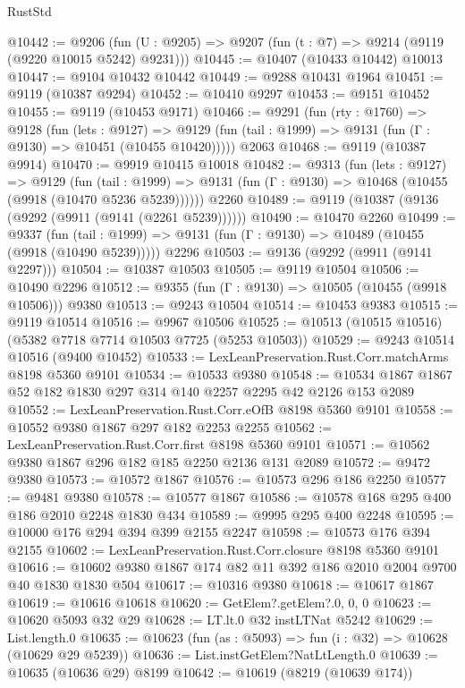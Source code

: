 \begin{lexlean}{RustStd}
\begin{coremodule}
@10442 := @9206
    (fun (U : @9205) => @9207 (fun (t : @7) => @9214 (@9119 (@9220 @10015 @5242) @9231)))
@10445 := @10407 (@10433 @10442) @10013
@10447 := @9104 @10432 @10442
@10449 := @9288 @10431 @1964
@10451 := @9119 (@10387 @9294)
@10452 := @10410 @9297
@10453 := @9151 @10452
@10455 := @9119 (@10453 @9171)
@10466 := @9291
    (fun (rty : @1760) =>
    @9128
      (fun (lets : @9127) =>
      @9129 (fun (tail : @1999) => @9131 (fun (Γ : @9130) => @10451 (@10455 @10420)))))
    @2063
@10468 := @9119 (@10387 @9914)
@10470 := @9919 @10415 @10018
@10482 := @9313
    (fun (lets : @9127) =>
    @9129
      (fun (tail : @1999) =>
      @9131 (fun (Γ : @9130) => @10468 (@10455 (@9918 (@10470 @5236 @5239))))))
    @2260
@10489 := @9119 (@10387 (@9136 (@9292 (@9911 (@9141 (@2261 @5239))))))
@10490 := @10470 @2260
@10499 := @9337
    (fun (tail : @1999) => @9131 (fun (Γ : @9130) => @10489 (@10455 (@9918 (@10490 @5239)))))
    @2296
@10503 := @9136 (@9292 (@9911 (@9141 @2297)))
@10504 := @10387 @10503
@10505 := @9119 @10504
@10506 := @10490 @2296
@10512 := @9355 (fun (Γ : @9130) => @10505 (@10455 (@9918 @10506))) @9380
@10513 := @9243 @10504
@10514 := @10453 @9383
@10515 := @9119 @10514
@10516 := @9967 @10506
@10525 := @10513 (@10515 @10516) (@5382 @7718 @7714 @10503 @7725 (@5253 @10503))
@10529 := @9243 @10514 @10516 (@9400 @10452)
@10533 := LexLeanPreservation.Rust.Corr.matchArms @8198 @5360 @9101
@10534 := @10533 @9380
@10548 := @10534 @1867 @1867 @52 @182 @1830 @297 @314 @140 @2257 @2295 @42 @2126 @153 @2089
@10552 := LexLeanPreservation.Rust.Corr.eOfB @8198 @5360 @9101
@10558 := @10552 @9380 @1867 @297 @182 @2253 @2255
@10562 := LexLeanPreservation.Rust.Corr.first @8198 @5360 @9101
@10571 := @10562 @9380 @1867 @296 @182 @185 @2250 @2136 @131 @2089
@10572 := @9472 @9380
@10573 := @10572 @1867
@10576 := @10573 @296 @186 @2250
@10577 := @9481 @9380
@10578 := @10577 @1867
@10586 := @10578 @168 @295 @400 @186 @2010 @2248 @1830 @434
@10589 := @9995 @295 @400 @2248
@10595 := @10000 @176 @294 @394 @399 @2155 @2247
@10598 := @10573 @176 @394 @2155
@10602 := LexLeanPreservation.Rust.Corr.closure @8198 @5360 @9101
@10616 := @10602 @9380 @1867 @174 @82 @11 @392 @186 @2010 @2004 @9700 @40 @1830 @1830 @504
@10617 := @10316 @9380
@10618 := @10617 @1867
@10619 := @10616 @10618
@10620 := GetElem?.getElem?.{0, 0, 0}
@10623 := @10620 @5093 @32 @29
@10628 := LT.lt.{0} @32 instLTNat @5242
@10629 := List.length.{0}
@10635 := @10623 (fun (as : @5093) => fun (i : @32) => @10628 (@10629 @29 @5239))
@10636 := List.instGetElem?NatLtLength.{0}
@10639 := @10635 (@10636 @29) @8199
@10642 := @10619 (@8219 (@10639 @174))

\end{coremodule}
\end{lexlean}
